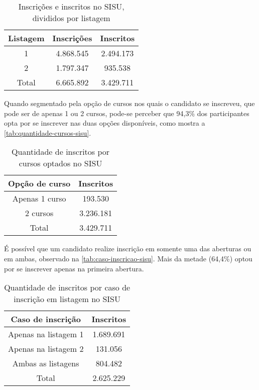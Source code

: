 \begin{table}[h]
  \begin{tabular}{ccc}
  \hline
  \multicolumn{1}{c}{\textbf{Listagem}} & \textbf{Inscrições} & \textbf{Inscritos} \\ \hline
  1                                     & 4.868.545                           & 2.494.173                          \\ \hline
  2                                     & 1.797.347                           & 935.538                           \\ \hline
  Total                                 & 6.665.892                           & 3.429.711                          \\ \hline
  \end{tabular}
  \caption{Inscrições e inscritos no SISU, divididos por listagem}
  \label{tab:inscricoes-inscritos-sisu}
  \end{table}

Quando segmentado pela opção de cursos nos quais o candidato se inscreveu, que pode ser de apenas 1 ou 2 cursos, pode-se perceber que 94,3\% dos participantes opta por se inscrever nas duas opções disponíveis, como mostra a \autoref{tab:quantidade-cursos-sisu}.

  \begin{table}[h]
    \begin{tabular}{cc}
    \hline
    \textbf{Opção de curso} & \textbf{Inscritos} \\ \hline
    Apenas 1 curso          & 193.530                           \\ \hline
    2 cursos                & 3.236.181                          \\ \hline
    Total                   & 3.429.711                          \\ \hline
    \end{tabular}
    \caption{Quantidade de inscritos por cursos optados no SISU}
    \label{tab:quantidade-cursos-sisu}
    \end{table}

É possível que um candidato realize inscrição em somente uma das aberturas ou em ambas, observado na \autoref{tab:caso-inscricao-sisu}. Mais da metade (64,4\%) optou por se inscrever apenas na primeira abertura.

\begin{table}[h]
  \begin{tabular}{cc}
  \hline
  \multicolumn{1}{c}{\textbf{Caso de inscrição}}        & \textbf{Inscritos} \\ \hline
  Apenas na listagem 1  & 1.689.691                          \\ \hline
  Apenas na listagem 2  & 131.056                           \\ \hline
  Ambas as listagens & 804.482                           \\ \hline
  \multicolumn{1}{c}{Total}                & 2.625.229                          \\ \hline
  \end{tabular}
  \caption{Quantidade de inscritos por caso de inscrição em listagem no SISU}
  \label{tab:caso-inscricao-sisu}
  \end{table}

